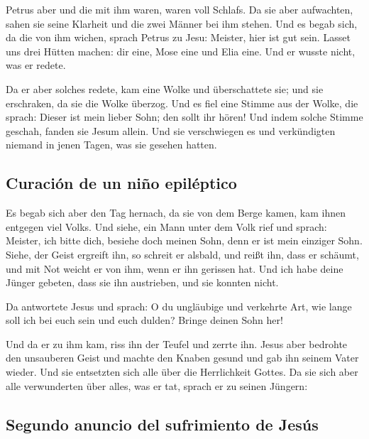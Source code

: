  Petrus aber und die mit ihm waren, waren voll Schlafs.
Da sie aber aufwachten, sahen sie seine Klarheit und die zwei Männer bei
ihm stehen.  Und es begab sich, da die von ihm wichen,
sprach Petrus zu Jesu: Meister, hier ist gut sein. Lasset uns drei
Hütten machen: dir eine, Mose eine und Elia eine. Und er wusste nicht,
was er redete.

 Da er aber solches redete, kam eine Wolke und
überschattete sie; und sie erschraken, da sie die Wolke überzog.
 Und es fiel eine Stimme aus der Wolke, die sprach:
Dieser ist mein lieber Sohn; den sollt ihr hören!  Und
indem solche Stimme geschah, fanden sie Jesum allein. Und sie
verschwiegen es und verkündigten niemand in jenen Tagen, was sie gesehen
hatten.

\hypertarget{curaciuxf3n-de-un-niuxf1o-epiluxe9ptico}{%
\subsection{Curación de un niño
epiléptico}\label{curaciuxf3n-de-un-niuxf1o-epiluxe9ptico}}

 Es begab sich aber den Tag hernach, da sie von dem Berge
kamen, kam ihnen entgegen viel Volks.  Und siehe, ein
Mann unter dem Volk rief und sprach: Meister, ich bitte dich, besiehe
doch meinen Sohn, denn er ist mein einziger Sohn.  Siehe,
der Geist ergreift ihn, so schreit er alsbald, und reißt ihn, dass er
schäumt, und mit Not weicht er von ihm, wenn er ihn gerissen hat.
 Und ich habe deine Jünger gebeten, dass sie ihn
austrieben, und sie konnten nicht.

 Da antwortete Jesus und sprach: O du ungläubige und
verkehrte Art, wie lange soll ich bei euch sein und euch dulden? Bringe
deinen Sohn her!

 Und da er zu ihm kam, riss ihn der Teufel und zerrte
ihn. Jesus aber bedrohte den unsauberen Geist und machte den Knaben
gesund und gab ihn seinem Vater wieder.  Und sie
entsetzten sich alle über die Herrlichkeit Gottes. Da sie sich aber alle
verwunderten über alles, was er tat, sprach er zu seinen Jüngern:

\hypertarget{segundo-anuncio-del-sufrimiento-de-jesuxfas}{%
\subsection{Segundo anuncio del sufrimiento de
Jesús}\label{segundo-anuncio-del-sufrimiento-de-jesuxfas}}

